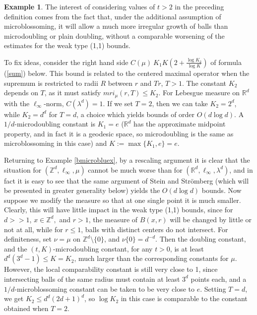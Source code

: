 \documentclass[12pt]{amsart}
\theoremstyle{definition}
\newtheorem{example}[theorem]{Example}
\theoremstyle{parrafo}
\begin{document}
 \begin{example} \label{macrodoub}
 The interest of considering values of $t >2$ in the preceding 
 definition comes from the fact that, under the additional assumption of microblossoming, it
 will allow a  much  more irregular 
  growth of balls than microdoubling or plain doubling, without a comparable  worsening 
  of the estimates for the weak type (1,1) bounds. 

To fix ideas, consider the right hand side 
$ C(\mu) \ K_1 K \left(2 + \frac{\log K_2}{\log K}\right)$ 
of formula (\ref{sum}) below. This bound is related to the centered maximal operator when the supremum is restricted
to radii $R$ between $r$ and $T r$, $T > 1$. The constant $K_2$ depends on $T$, as it must satisfy 
$ mri_{\mu}(r, T) \le K_2$.
 For Lebesgue measure
on $\mathbb{R}^d$ with the $\ell_\infty$-norm, $ C(\lambda^d) = 1$. If we set $T=2$, then we can take
$K_2 = 2^d$, while $K_2 = d^d$ for $T=d$,   a choice which yields bounds of order $O( d \log d)$.
 A  $1/d$-microdoubling constant is $K_1 = e$ ($\mathbb{R}^d$ has the approximate midpoint
property, and in fact it is a geodesic space, so microdoubling is the same as microblossoming in this case) and $K := \max\{K_1, e\} = e$.
  
  Returning to Example \ref{bmicrobluex},  by a rescaling  argument it is clear that  the situation
  for 
    $(\mathbb{Z}^d, \ell_\infty, \mu)$ cannot be much worse than for
    $(\mathbb{R}^d, \ell_\infty, \lambda^d)$, and in fact it is easy to see that
    the same argument of Stein and Str\"omberg (which will be presented in greater
    generality below) yields  the  $O( d \log d)$ bounds. Now suppose  we modify
    the measure so that at one single point it is much smaller. Clearly, this will have
    little impact in the weak type (1,1) bounds, since for $d >>1$, $x \in \mathbb{Z}^d,$ and $r>1$, the measure of $B(x,r)$
    will be changed by little or not at all, while for $ r \le 1$, balls with distinct centers do not
    intersect. For definiteness, set $\nu = \mu$ on  $\mathbb{Z}^d \setminus \{0\}$,
    and $\nu \{0\} = d ^{-d}$. Then the doubling constant, and the 
$(t,K)$-microdoubling constant, for any $t > 0$, is at least $d ^{d} (3 ^{d} -1) \le  K = K_2$,  much larger than the corresponding constants for $\mu$.
However, the local comparability constant is still very close to 1, since intersecting balls of the same radius must
contain at least $3^d$ points each, and a $1/d$-microblossoming constant can be taken to be very close to $e$.
Setting 
$T = d$, we get $K_2 \le d^d (2d + 1)^d$, so $\log K_2$ in this case is comparable to the constant obtained when $T = 2$.
 \end{example}
\end{document}
